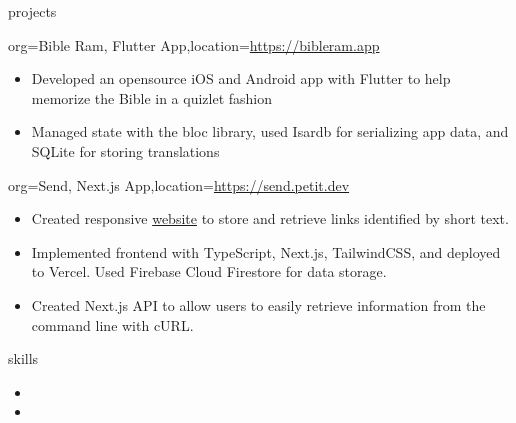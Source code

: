 \documentclass{resume}
\begin{document}
\begin{ResumeSection}{projects}
    \begin{ResumeProject}{org={Bible Ram, Flutter
        App},location={\href{https://bibleram.app}{https://bibleram.app}}}
        \begin{itemize}
            \item {Developed an opensource iOS and Android app with Flutter to help memorize the Bible in a quizlet
                fashion} 
            \item {Managed state with the bloc library,
                used Isardb for serializing app data, and SQLite for storing
            translations}
        \end{itemize}
    \end{ResumeProject}
    \begin{ResumeProject}{org={Send, Next.js App},location={\href{https://send.petit.dev}{https://send.petit.dev}}}
        \begin{itemize}
            \item {Created responsive \href{https://send.petit.dev}{website} to store and retrieve links identified by short text.}
            \item {Implemented frontend with TypeScript, Next.js, TailwindCSS, and deployed to Vercel. Used Firebase Cloud Firestore for data storage.}
            \item {Created Next.js API to allow users to easily retrieve information from the command line with cURL.}
        \end{itemize}
    \end{ResumeProject}
\end{ResumeSection}

\begin{ResumeSection}{skills}
        \begin{itemize}
            \item {}
            \item {}
        \end{itemize}
\end{ResumeSection}
\end{document}
